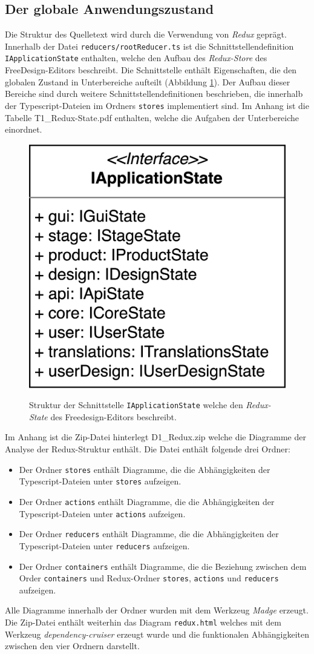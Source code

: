 \subsection{Der globale Anwendungszustand}
Die Struktur des Quelletext wird durch die Verwendung von \emph{Redux} geprägt. Innerhalb der Datei \lstinline|reducers/rootReducer.ts| ist die Schnittstellendefinition \lstinline|IApplicationState| enthalten, welche den Aufbau des \emph{Redux-Store} des FreeDesign-Editors beschreibt. Die Schnittstelle enthält Eigenschaften, die den globalen Zustand in Unterbereiche aufteilt (Abbildung \ref{fig:IApplicationState}). Der Aufbau dieser Bereiche sind durch weitere Schnittstellendefinitionen beschrieben, die innerhalb der Typescript-Dateien im Ordners \lstinline|stores| implementiert sind. 
Im Anhang ist die Tabelle T1\_Redux-State.pdf enthalten, welche die Aufgaben der Unterbereiche einordnet. 


\begin{figure}[H]
    \centering
    \caption{Struktur der Schnittstelle \lstinline|IApplicationState| welche den \emph{Redux-State} des Freedesign-Editors beschreibt.}
    \includegraphics[width=.3\textwidth]{diagrams/Ist-Architektur/IApplicationState.png}
    \label{fig:IApplicationState}
\end{figure}


Im Anhang ist die Zip-Datei hinterlegt D1\_Redux.zip welche die Diagramme der Analyse der Redux-Struktur enthält.
Die Datei enthält folgende drei Ordner:  
\begin{itemize}
    \item Der Ordner \lstinline|stores| enthält Diagramme, die die Abhängigkeiten der Typescript-Dateien unter \lstinline|stores| aufzeigen.
    \item Der Ordner \lstinline|actions| enthält Diagramme, die die Abhängigkeiten der Typescript-Dateien unter \lstinline|actions| aufzeigen.
    \item Der Ordner \lstinline|reducers| enthält Diagramme, die die Abhängigkeiten der Typescript-Dateien unter \lstinline|reducers| aufzeigen. 
    \item Der Ordner \lstinline|containers| enthält Diagramme, die die Beziehung zwischen dem Order \lstinline|containers| und Redux-Ordner \lstinline|stores|, \lstinline|actions| und \lstinline|reducers| aufzeigen.
\end{itemize}
Alle Diagramme innerhalb der Ordner wurden mit dem Werkzeug \emph{Madge} erzeugt.
Die Zip-Datei enthält weiterhin das Diagram \lstinline|redux.html| welches mit dem Werkzeug \emph{dependency-cruiser} erzeugt wurde und die funktionalen Abhängigkeiten zwischen den vier Ordnern darstellt.

